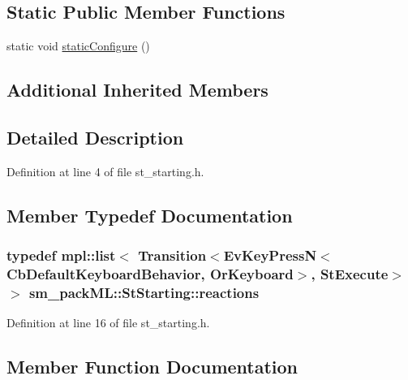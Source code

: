 \subsection*{Static Public Member Functions}
\begin{DoxyCompactItemize}
\item 
static void \hyperlink{structsm__packML_1_1StStarting_a027b510edb3a7fc5bc344ad9b7917f79}{static\+Configure} ()
\end{DoxyCompactItemize}
\subsection*{Additional Inherited Members}


\subsection{Detailed Description}


Definition at line 4 of file st\+\_\+starting.\+h.



\subsection{Member Typedef Documentation}
\subsubsection[{\texorpdfstring{reactions}{reactions}}]{\setlength{\rightskip}{0pt plus 5cm}typedef mpl\+::list$<$ Transition$<$Ev\+Key\+PressN$<$Cb\+Default\+Keyboard\+Behavior, {\bf Or\+Keyboard}$>$, {\bf St\+Execute}$>$ $>$ {\bf sm\+\_\+pack\+M\+L\+::\+St\+Starting\+::reactions}}\hypertarget{structsm__packML_1_1StStarting_a9e71c6c4aafa4a6ee4b35666cc953a4d}{}\label{structsm__packML_1_1StStarting_a9e71c6c4aafa4a6ee4b35666cc953a4d}


Definition at line 16 of file st\+\_\+starting.\+h.



\subsection{Member Function Documentation}
